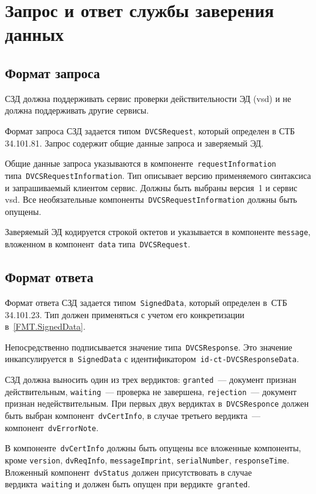 \section{Запрос и ответ службы заверения данных}\label{FMT.DVCS}

\subsection{Формат запроса}

СЗД должна поддерживать сервис проверки действительности ЭД (vsd) и не 
должна поддерживать другие сервисы.

Формат запроса СЗД задается типом~\texttt{DVCSRequest}, который определен  
в СТБ 34.101.81. Запрос содержит общие данные запроса и заверяемый ЭД.

Общие данные запроса указываются в компоненте~\texttt{requestInformation}
типа~\texttt{DVCSRequestInformation}. Тип описывает версию 
применяемого синтаксиса и запрашиваемый клиентом сервис. 
Должны быть выбраны версия~1 и сервис vsd. Все необязательные 
компоненты~\texttt{DVCSRequestInformation} должны быть опущены.

Заверяемый ЭД кодируется строкой октетов 
и указывается в компоненте \texttt{message}, вложенном в 
компонент~\texttt{data} типа~\texttt{DVCSRequest}.

\subsection{Формат ответа}

Формат ответа СЗД задается типом~\texttt{SignedData}, который определен 
в~СТБ 34.101.23. Тип должен применяться с учетом его конкретизации 
в~\ref{FMT.SignedData}. 
 
Непосредственно подписывается значение типа~\texttt{DVCSResponse}.
Это значение инкапсулируется в~\texttt{SignedData} с 
идентификатором~\texttt{id-ct-DVCSResponseData}.

СЗД должна выносить один из трех вердиктов:
\texttt{granted}~--- документ признан действительным,
\texttt{waiting}~--- проверка не завершена,
\texttt{rejection}~--- документ признан недействительным.
%
При первых двух вердиктах в~\texttt{DVCSResponce}
должен быть выбран компонент~\texttt{dvCertInfo},
в случае третьего вердикта~--- компонент~\texttt{dvErrorNote}.

В компоненте~\texttt{dvCertInfo} должны быть опущены все вложенные 
компоненты, кроме \texttt{version}, \texttt{dvReqInfo}, \texttt{messageImprint}, 
\texttt{serialNumber}, \texttt{responseTime}.
Вложенный компонент~\texttt{dvStatus} должен присутствовать в случае 
вердикта~\texttt{waiting} и должен быть опущен при 
вердикте~\texttt{granted}. 


